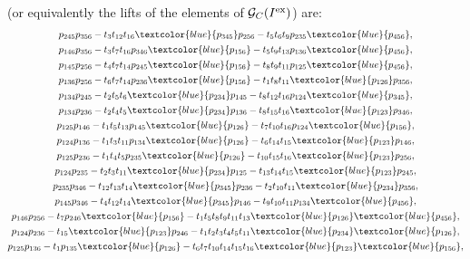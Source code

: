 \documentclass[pdftex]{sigma}%
\numberwithin{equation}{section}
\begin{document}
 (or equivalently the lifts of the elements of $\mathcal G_{C}(I^{\rm ex})$) are:
\begin{gather*}
p_{245}p_{356} - t_{3}t_{12}t_{16}\textcolor{blue}{p_{345}}p_{256}-t_{5}t_{6}t_{9}p_{235}\textcolor{blue}{p_{456}},
\\[.2ex]
p_{146}p_{356}-t_{3}t_{7}t_{16}p_{346}\textcolor{blue}{p_{156}}-t_{5}t_{9}t_{13}p_{136} \textcolor{blue}{p_{456}},
\\[.2ex]
p_{145}p_{256}-t_{4}t_{7}t_{14}p_{245}\textcolor{blue}{p_{156}}-t_{8}t_{9}t_{11}p_{125}\textcolor{blue}{p_{456}},\\[.2ex]
p_{136}p_{256}-t_{6}t_{7}t_{14}p_{236}\textcolor{blue}{p_{156}}-t_{1}t_{8}t_{11}\textcolor{blue}{p_{126}}p_{356},\\[.2ex]
p_{134}p_{245}-t_{2}t_{5}t_{6}\textcolor{blue}{p_{234}}p_{145}-t_{8}t_{12}t_{16}p_{124}\textcolor{blue}{p_{345}},\\[.2ex]
p_{134}p_{236}-t_{2}t_{4}t_{5}\textcolor{blue}{p_{234}}p_{136}-t_{8}t_{15}t_{16}\textcolor{blue}{p_{123}}p_{346},\\[.2ex]
p_{125}p_{146}-t_{1}t_{5}t_{13}p_{145}\textcolor{blue}{p_{126}}-t_{7}t_{10}t_{16}p_{124}\textcolor{blue}{p_{156}},\\[.2ex]
p_{124}p_{136}-t_{1}t_{3}t_{11}p_{134}\textcolor{blue}{p_{126}}-t_{6}t_{14}t_{15}\textcolor{blue}{p_{123}}p_{146},\\[.2ex]
p_{125}p_{236}-t_{1}t_{4}t_{5}p_{235}\textcolor{blue}{p_{126}}-t_{10}t_{15}t_{16}\textcolor{blue}{p_{123}}p_{256},\\[.2ex]
p_{124}p_{235}-t_{2}t_{3}t_{11}\textcolor{blue}{p_{234}}p_{125}-t_{13}t_{14}t_{15}\textcolor{blue}{p_{123}}p_{245},\\[.2ex]
p_{235}p_{346}-t_{12}t_{13}t_{14}\textcolor{blue}{p_{345}}p_{236}-t_{2}t_{10}t_{11}\textcolor{blue}{p_{234}}p_{356},\\[.2ex]
p_{145}p_{346}-t_{4}t_{12}t_{14}\textcolor{blue}{p_{345}}p_{146}-t_{9}t_{10}t_{11}p_{134}\textcolor{blue}{p_{456}},\\[.2ex]
p_{146}p_{256}-t_{7}p_{246}\textcolor{blue}{p_{156}}-t_{1}t_{5}t_{8}t_{9}t_{11}t_{13}\textcolor{blue}{p_{126}}\textcolor{blue}{p_{456}},\\[.2ex]
p_{124}p_{236}-t_{15}\textcolor{blue}{p_{123}}p_{246}-t_{1}t_{2}t_{3}t_{4}t_{5}t_{11}\textcolor{blue}{p_{234}}\textcolor{blue}{p_{126}},\\[.2ex]
p_{125}p_{136}-t_{1}p_{135}\textcolor{blue}{p_{126}}-t_{6}t_{7}t_{10}t_{14}t_{15}t_{16}\textcolor{blue}{p_{123}}\textcolor{blue}{p_{156}},

\end{gather*}
\end{document}
